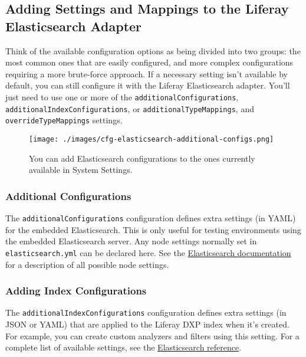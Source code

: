 \subsection{Adding Settings and Mappings to the Liferay Elasticsearch
Adapter}\label{adding-settings-and-mappings-to-the-liferay-elasticsearch-adapter}

Think of the available configuration options as being divided into two
groups: the most common ones that are easily configured, and more
complex configurations requiring a more brute-force approach. If a
necessary setting isn't available by default, you can still configure it
with the Liferay Elasticsearch adapter. You'll just need to use one or
more of the \texttt{additionalConfigurations},
\texttt{additionalIndexConfigurations}, or
\texttt{additionalTypeMappings}, and \texttt{overrideTypeMappings}
settings.

\begin{figure}
\centering
\texttt{[image: ./images/cfg-elasticsearch-additional-configs.png]}
\caption{You can add Elasticsearch configurations to the ones currently
available in System Settings.}
\end{figure}

\subsubsection{Additional
Configurations}\label{additional-configurations}

The \texttt{additionalConfigurations} configuration defines extra
settings (in YAML) for the embedded Elasticsearch. This is only useful
for testing environments using the embedded Elasticsearch server. Any
node settings normally set in \texttt{elasticsearch.yml} can be declared
here. See the
\href{https://www.elastic.co/guide/en/elasticsearch/reference/6.5/index.html}{Elasticsearch
documentation} for a description of all possible node settings.

\subsubsection{Adding Index
Configurations}\label{adding-index-configurations}

The \texttt{additionalIndexConfigurations} configuration defines extra
settings (in JSON or YAML) that are applied to the Liferay DXP index
when it's created. For example, you can create custom analyzers and
filters using this setting. For a complete list of available settings,
see the
\href{https://www.elastic.co/guide/en/elasticsearch/reference/6.5/index-modules.html}{Elasticsearch
reference}.

